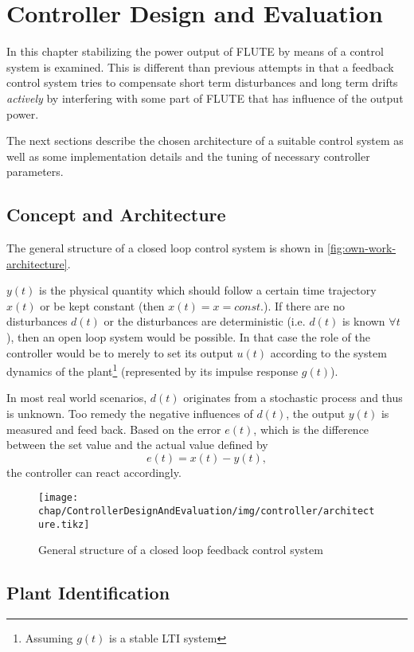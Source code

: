 \chapter{Controller Design and Evaluation}
In this chapter stabilizing the power output of FLUTE by means of a control system is examined. This is different than previous attempts in that a feedback control system tries to compensate short term disturbances and long term drifts \textit{actively} by interfering with some part of FLUTE that has influence of the output power.

The next sections describe the chosen architecture of a suitable control system as well as some implementation details and the tuning of necessary controller parameters.

\section{Concept and Architecture}
The general structure of a closed loop control system is shown in \autoref{fig:own-work-architecture}.

$y(t)$ is the physical quantity which should follow a certain time trajectory $x(t)$ or be kept constant (then $x(t)=x=const.$). If there are no disturbances $d(t)$ or the disturbances are deterministic (i.e. $d(t)$ is known $\forall t$), then an open loop system would be possible. In that case the role of the controller would be to merely to set its output $u(t)$ according to the system dynamics of the plant\footnote{Assuming $g(t)$ is a stable LTI system} (represented by its impulse response $g(t)$).

In most real world scenarios, $d(t)$ originates from a stochastic process and thus is unknown. Too remedy the negative influences of $d(t)$, the output $y(t)$ is measured and feed back. Based on the error $e(t)$, which is the difference between the set value and the actual value defined by
\begin{equation}
e(t) = x(t) - y(t),
\end{equation}
the controller can react accordingly.

\begin{figure}[tb]
	\centering
	\texttt{[image: chap/ControllerDesignAndEvaluation/img/controller/architecture.tikz]}
	\caption{General structure of a closed loop feedback control system}
	\label{fig:own-work-architecture}
\end{figure}

\section{Plant Identification}
